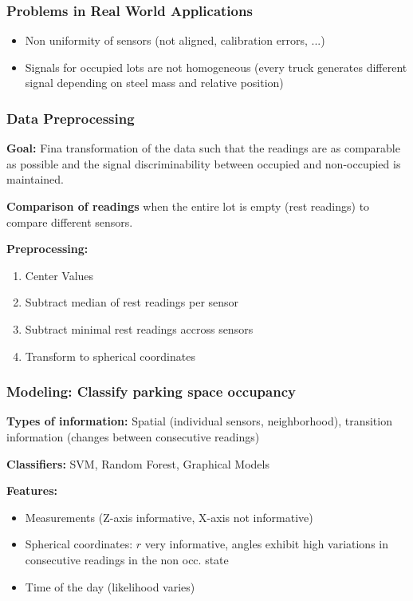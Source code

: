 \subsubsection{Problems in Real World Applications}
\begin{itemize}
	\item Non uniformity of sensors (not aligned, calibration errors, ...)
	\item Signals for occupied lots are not homogeneous (every truck generates different signal depending on steel mass and relative position)
\end{itemize}

\subsubsection{Data Preprocessing}
\textbf{Goal: } Fina transformation of the data such that the readings are as comparable as possible and the signal discriminability between occupied and non-occupied is maintained.

\textbf{Comparison of readings} when the entire lot is empty (rest readings) to compare different sensors.

\textbf{Preprocessing: }
\begin{enumerate}
	\item Center Values
	\item Subtract median of rest readings per sensor
	\item Subtract minimal rest readings accross sensors
	\item Transform to spherical coordinates
\end{enumerate}

\subsubsection{Modeling: Classify parking space occupancy}
\textbf{Types of information: } Spatial (individual sensors, neighborhood), transition information (changes between consecutive readings)

\textbf{Classifiers: } SVM, Random Forest, Graphical Models

\textbf{Features: }
\begin{itemize}
	\item Measurements (Z-axis informative, X-axis not informative)
	\item Spherical coordinates: $r$ very informative, angles exhibit high variations in consecutive readings in the non occ. state
	\item Time of the day (likelihood varies)
\end{itemize}
